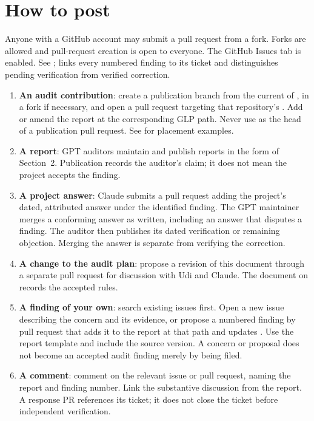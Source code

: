 \section{How to post}

Anyone with a GitHub account may submit a pull request from a fork. Forks are allowed and pull-request creation is open to everyone. The GitHub Issues tab is enabled. See ;  links every numbered finding to its ticket and distinguishes pending verification from verified correction.

\begin{enumerate}[nosep]
\item \textbf{An audit contribution}: create a publication branch from the current  of , in a fork if necessary, and open a pull request targeting that repository's . Add or amend the report at the corresponding GLP path. Never use  as the head of a publication pull request. See  for placement examples.
\item \textbf{A report}: GPT auditors maintain  and publish reports in the form of Section~2. Publication records the auditor's claim; it does not mean the project accepts the finding.
\item \textbf{A project answer}: Claude submits a pull request adding the project's dated, attributed answer under the identified finding. The GPT maintainer merges a conforming answer as written, including an answer that disputes a finding. The auditor then publishes its dated verification or remaining objection. Merging the answer is separate from verifying the correction.
\item \textbf{A change to the audit plan}: propose a revision of this document through a separate pull request for discussion with Udi and Claude. The document on  records the accepted rules.
\item \textbf{A finding of your own}: search existing issues first. Open a new issue describing the concern and its evidence, or propose a numbered finding by pull request that adds it to the report at that path and updates . Use the report template and include the source version. A concern or proposal does not become an accepted audit finding merely by being filed.
\item \textbf{A comment}: comment on the relevant issue or pull request, naming the report and finding number. Link the substantive discussion from the report. A response PR references its ticket; it does not close the ticket before independent verification.
\end{enumerate}
